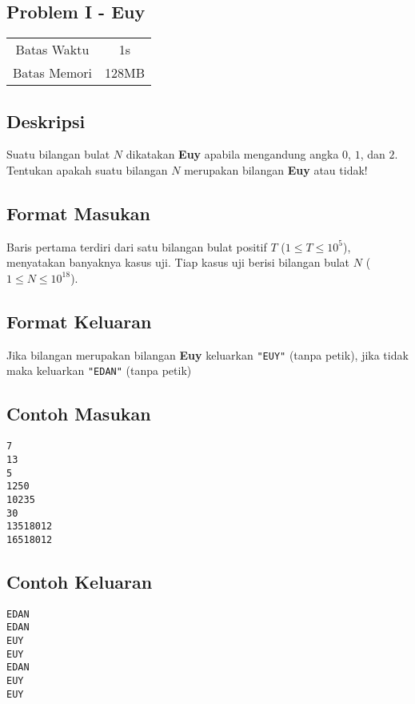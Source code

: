 \documentclass{article}
\begin{document}
\begin{center}
    \section*{Problem I - Euy} %

    \begin{tabular}{ | c c | }
        \hline
        Batas Waktu  & 1s \\    %
        Batas Memori & 128MB \\  %
        \hline
    \end{tabular}
\end{center}

\subsection*{Deskripsi}

Suatu bilangan bulat $N$ dikatakan \textbf{Euy} apabila mengandung angka $0$, $1$, dan $2$. Tentukan apakah suatu bilangan $N$ merupakan bilangan \textbf{Euy} atau tidak!

\subsection*{Format Masukan}

Baris pertama terdiri dari satu bilangan bulat positif $T$ ($1 \leq T \leq 10^5$), menyatakan banyaknya kasus uji.
Tiap kasus uji berisi bilangan bulat $N$ ($1 \leq N \leq 10^{18}$).

\subsection*{Format Keluaran}

Jika bilangan merupakan bilangan \textbf{Euy} keluarkan \lstinline{"EUY"} (tanpa petik), jika tidak maka keluarkan \lstinline{"EDAN"} (tanpa petik)

\begin{multicols}{2}
\subsection*{Contoh Masukan}
\begin{lstlisting}
7
13
5
1250
10235
30
13518012
16518012
\end{lstlisting}
\columnbreak
\subsection*{Contoh Keluaran}
\begin{lstlisting}
EDAN
EDAN
EUY
EUY
EDAN
EUY
EUY
\end{lstlisting}
\vfill
\null
\end{multicols}


\pagebreak
\end{document}
